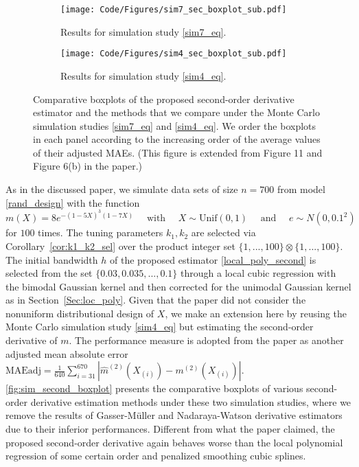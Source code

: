 \documentclass{uwstat572}
\theoremstyle{definition}
\renewcommand{\hat}{\widehat}
\theoremstyle{theorem}
\begin{document}
\begin{figure}
	\captionsetup[subfigure]{justification=centering}
	\begin{subfigure}[t]{0.49\linewidth}
		\centering
		\texttt{[image: Code/Figures/sim7\_sec\_boxplot\_sub.pdf]}
		\caption{Results for simulation study \eqref{sim7_eq}.}
	\end{subfigure}
	\hfil
	\begin{subfigure}[t]{0.49\linewidth}
		\centering
		\texttt{[image: Code/Figures/sim4\_sec\_boxplot\_sub.pdf]}
		\caption{Results for simulation study \eqref{sim4_eq}.}
	\end{subfigure}
	\caption{Comparative boxplots of the proposed second-order derivative estimator and the methods that we compare under the Monte Carlo simulation studies \eqref{sim7_eq} and \eqref{sim4_eq}. We order the boxplots in each panel according to the increasing order of the average values of their adjusted MAEs. (This figure is extended from Figure 11 and Figure 6(b) in the paper.)}
	\label{fig:sim_second_boxplot}
\end{figure}

As in the discussed paper, we simulate data sets of size $n=700$ from model \eqref{rand_design} with the function
\begin{equation}
\label{sim7_eq}
m(X) = 8e^{-(1-5X)^3(1-7X)} \quad \text{ with } \quad X\sim \mathrm{Unif}(0,1) \quad \text{ and } \quad e\sim N(0,0.1^2)
\end{equation}
for $100$ times. The tuning parameters $k_1,k_2$ are selected via Corollary~\ref{cor:k1_k2_sel} over the product integer set $\{1,...,100\} \otimes \{1,...,100\}$. The initial bandwidth $h$ of the proposed estimator \eqref{local_poly_second} is selected from the set $\{0.03, 0.035,...,0.1\}$ through a local cubic regression with the bimodal Gaussian kernel and then corrected for the unimodal Gaussian kernel as in Section~\ref{Sec:loc_poly}. Given that the paper did not consider the nonuniform distributional design of $X$, we make an extension here by reusing the Monte Carlo simulation study \eqref{sim4_eq} but estimating the second-order derivative of $m$. The performance measure is adopted from the paper as another adjusted mean absolute error $\text{MAEadj}=\frac{1}{640}\sum_{i=31}^{670} \left|\hat{m}^{(2)}(X_{(i)}) - m^{(2)}(X_{(i)}) \right|$. \autoref{fig:sim_second_boxplot} presents the comparative boxplots of various second-order derivative estimation methods under these two simulation studies, where we remove the results of Gasser-M\"uller and Nadaraya-Watson derivative estimators due to their inferior performances. Different from what the paper claimed, the proposed second-order derivative again behaves worse than the local polynomial regression of some certain order and penalized smoothing cubic splines.
\end{document}
